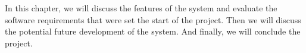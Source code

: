In this chapter, we will discuss the features of the system and evaluate the software requirements that were set the
start of the project.
Then we will discuss the potential future development of the system.
And finally, we will conclude the project.
